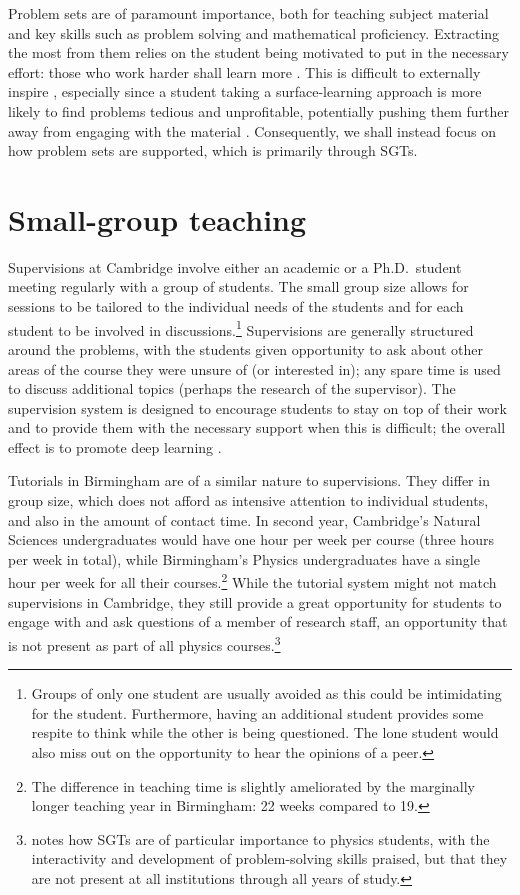 Problem sets are of paramount importance, both for teaching subject material and key skills such as problem solving and mathematical proficiency. Extracting the most from them relies on the student being motivated to put in the necessary effort: those who work harder shall learn more \citep{Gibbs2015}. This is difficult to externally inspire \citep[cf.][]{Ryan2000}, especially since a student taking a surface-learning approach is more likely to find problems tedious and unprofitable, potentially pushing them further away from engaging with the material \citep[chapter 4]{Ramsden1992}. Consequently, we shall instead focus on how problem sets are supported, which is primarily through SGTs.

\section{Small-group teaching}\label{sec:small}

Supervisions at Cambridge involve either an academic or a Ph.D.\ student meeting regularly with a group of students. The small group size allows for sessions to be tailored to the individual needs of the students and for each student to be involved in discussions.\footnote{Groups of only one student are usually avoided as this could be intimidating for the student. Furthermore, having an additional student provides some respite to think while the other is being questioned. The lone student would also miss out on the opportunity to hear the opinions of a peer.} Supervisions are generally structured around the problems, with the students given opportunity to ask about other areas of the course they were unsure of (or interested in); any spare time is used to discuss additional topics (perhaps the research of the supervisor). The supervision system is designed to encourage students to stay on top of their work and to provide them with the necessary support when this is difficult; the overall effect is to promote deep learning \citep[case study 14.1]{Gibbs2015}.

Tutorials in Birmingham are of a similar nature to supervisions. They differ in group size, which does not afford as intensive attention to individual students, and also in the amount of contact time. In second year, Cambridge's Natural Sciences undergraduates would have one hour per week per course (three hours per week in total), while Birmingham's Physics undergraduates have a single hour per week for all their courses.\footnote{The difference in teaching time is slightly ameliorated by the marginally longer teaching year in Birmingham: 22 weeks compared to 19.} While the tutorial system might not match supervisions in Cambridge, they still provide a great opportunity for students to engage with and ask questions of a member of research staff, an opportunity that is not present as part of all physics courses.\footnote{\citet{Sharma2007} notes how SGTs are of particular importance to physics students, with the interactivity and development of problem-solving skills praised, but that they are not present at all institutions through all years of study.}


